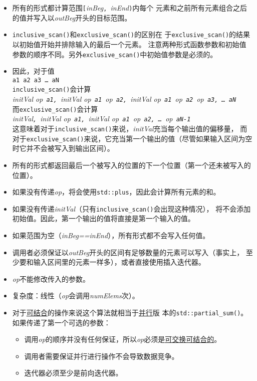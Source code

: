 \begin{itemize}
    \item 所有的形式都计算范围\texttt{[}\emph{inBeg}\texttt{, }\emph{inEnd}\texttt{)}内每个
    元素和之前所有元素组合之后的值并写入以\emph{outBeg}开头的目标范围。
    \item \texttt{inclusive\_scan()}和\texttt{exclusive\_scan()}的区别在
    于\texttt{exclusive\_scan()}的结果以初始值开始并排除输入的最后一个元素。
    注意两种形式函数参数和初始值参数的顺序不同。另外\texttt{exclusive\_scan()}中初始值参数是必须的。
    \item 因此，对于值\\
    \hspace*{2em}\texttt{a1 a2 a3 \ldots\ aN}\\
    \texttt{inclusive\_scan()}会计算\\
    \hspace*{2em}\emph{initVal op\texttt{ a1, }initVal op\texttt{ a1 }op\texttt{ a2, }initVal op\texttt{ a1 }op\texttt{ a2 }op\texttt{ a3, \ldots\ aN}}\\
    而\texttt{exclusive\_scan()}会计算\\
    \hspace*{2em}\emph{initVal\texttt{, }initVal op\texttt{ a1, }initVal op\texttt{ a1 }op\texttt{ a2, \ldots\ }op\texttt{ aN-1}}\\
    这意味着对于\texttt{inclusive\_scan()}来说，\emph{initVal}充当每个输出值的偏移量，
    而对于\texttt{exclusive\_scan()}来说，它充当第一个输出的值（尽管如果输入区间为空时它并不会被写入到输出区间）。
    \item 所有的形式都返回最后一个被写入的位置的下一个位置（第一个还未被写入的位置）。
    \item 如果没有传递\emph{op}，将会使用\texttt{std::plus}，因此会计算所有元素的和。
    \item 如果没有传递\emph{initVal}（只有\texttt{inclusive\_scan()}会出现这种情况），
    将不会添加初始值。因此，第一个输出的值将直接是第一个输入的值。
    \item 如果范围为空（\emph{inBeg==inEnd}），所有形式都不会写入任何值。
    \item 调用者必须保证以\emph{outBeg}开头的区间有足够数量的元素可以写入（事实上，
    至少要和输入区间里的元素一样多），或者直接使用插入迭代器。
    \item \emph{op}不能修改传入的参数。
    \item 复杂度：线性（\emph{op}会调用\emph{numElems}次）。
    \item 对于\hyperref[ch22.6.1.1]{可结合}的操作来说这个算法就相当于\hyperref[ch22]{并行}版
    本的\texttt{std::partial\_sum()}。如果传递了第一个可选的参数：
    \begin{itemize}
        \item 调用\emph{op}的顺序并没有任何保证，所以\emph{op}必须是\hyperref[ch22.6.1.1]{可交换可结合的}。
        \item 调用者需要保证并行进行操作不会导致数据竞争。
        \item 迭代器必须至少是前向迭代器。
    \end{itemize}
\end{itemize}
